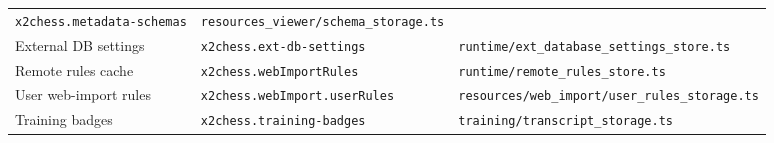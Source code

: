 \documentclass[]{article}
\begin{document}
\begin{longtable}[]{@{}lll@{}}
\begin{minipage}[t]{0.05\columnwidth}
\texttt{x2chess.metadata-schemas}\strut
\end{minipage} & \begin{minipage}[t]{0.05\columnwidth}\raggedright\strut
\texttt{resources\_viewer/schema\_storage.ts}\strut
\end{minipage}\tabularnewline
\begin{minipage}[t]{0.05\columnwidth}\raggedright\strut
External DB settings\strut
\end{minipage} & \begin{minipage}[t]{0.05\columnwidth}\raggedright\strut
\texttt{x2chess.ext-db-settings}\strut
\end{minipage} & \begin{minipage}[t]{0.05\columnwidth}\raggedright\strut
\texttt{runtime/ext\_database\_settings\_store.ts}\strut
\end{minipage}\tabularnewline
\begin{minipage}[t]{0.05\columnwidth}\raggedright\strut
Remote rules cache\strut
\end{minipage} & \begin{minipage}[t]{0.05\columnwidth}\raggedright\strut
\texttt{x2chess.webImportRules}\strut
\end{minipage} & \begin{minipage}[t]{0.05\columnwidth}\raggedright\strut
\texttt{runtime/remote\_rules\_store.ts}\strut
\end{minipage}\tabularnewline
\begin{minipage}[t]{0.05\columnwidth}\raggedright\strut
User web-import rules\strut
\end{minipage} & \begin{minipage}[t]{0.05\columnwidth}\raggedright\strut
\texttt{x2chess.webImport.userRules}\strut
\end{minipage} & \begin{minipage}[t]{0.05\columnwidth}\raggedright\strut
\texttt{resources/web\_import/user\_rules\_storage.ts}\strut
\end{minipage}\tabularnewline
\begin{minipage}[t]{0.05\columnwidth}\raggedright\strut
Training badges\strut
\end{minipage} & \begin{minipage}[t]{0.05\columnwidth}\raggedright\strut
\texttt{x2chess.training-badges}\strut
\end{minipage} & \begin{minipage}[t]{0.05\columnwidth}\raggedright\strut
\texttt{training/transcript\_storage.ts}\strut

\end{minipage}
\end{longtable}
\end{document}
